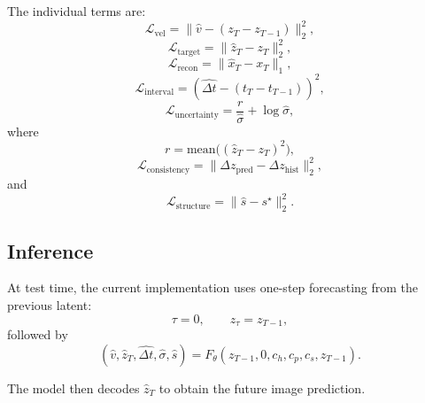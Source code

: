 The individual terms are:
\begin{equation}
\mathcal{L}_{\mathrm{vel}} = \|\hat{v} - (z_T-z_{T-1})\|_2^2,
\end{equation}
\begin{equation}
\mathcal{L}_{\mathrm{target}} = \|\hat{z}_T - z_T\|_2^2,
\end{equation}
\begin{equation}
\mathcal{L}_{\mathrm{recon}} = \|\hat{x}_T - x_T\|_1,
\end{equation}
\begin{equation}
\mathcal{L}_{\mathrm{interval}} = (\widehat{\Delta t} - (t_T-t_{T-1}))^2,
\end{equation}
\begin{equation}
\mathcal{L}_{\mathrm{uncertainty}} = \frac{r}{\hat{\sigma}} + \log \hat{\sigma},
\end{equation}
where
\begin{equation}
r = \mathrm{mean}\big((\hat{z}_T-z_T)^2\big),
\end{equation}
\begin{equation}
\mathcal{L}_{\mathrm{consistency}} =
\|\Delta z_{\mathrm{pred}} - \Delta z_{\mathrm{hist}}\|_2^2,
\end{equation}
and
\begin{equation}
\mathcal{L}_{\mathrm{structure}} = \|\hat{s}-s^\star\|_2^2.
\end{equation}

\subsection{Inference}

At test time, the current implementation uses one-step forecasting from the previous latent:
\begin{equation}
\tau = 0, \qquad z_\tau = z_{T-1},
\end{equation}
followed by
\begin{equation}
(\hat{v}, \hat{z}_T, \widehat{\Delta t}, \hat{\sigma}, \hat{s})
=
F_\theta(z_{T-1},0,c_h,c_p,c_s,z_{T-1}).
\end{equation}

The model then decodes $\hat{z}_T$ to obtain the future image prediction.
